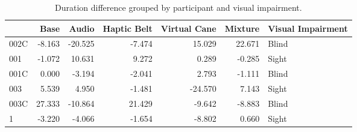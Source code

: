 
\begin{table}[!htb]
\centering
\caption{Duration difference grouped by participant and visual impairment.}
\label{tab:duracao_var_group}
\begin{tabular}{lrrrrrl}
\toprule
{} &   Base &   Audio &  Haptic Belt &  Virtual Cane &  Mixture & Visual Impairment \\
\midrule
002C & -8.163 & -20.525 &       -7.474 &        15.029 &   22.671 &             Blind \\
001  & -1.072 &  10.631 &        9.272 &         0.289 &   -0.285 &             Sight \\
001C &  0.000 &  -3.194 &       -2.041 &         2.793 &   -1.111 &             Blind \\
003  &  5.539 &   4.950 &       -1.481 &       -24.570 &    7.143 &             Sight \\
003C & 27.333 & -10.864 &       21.429 &        -9.642 &   -8.883 &             Blind \\
1    & -3.220 &  -4.066 &       -1.654 &        -8.802 &    0.660 &             Sight \\
\bottomrule
\end{tabular}
\end{table}


